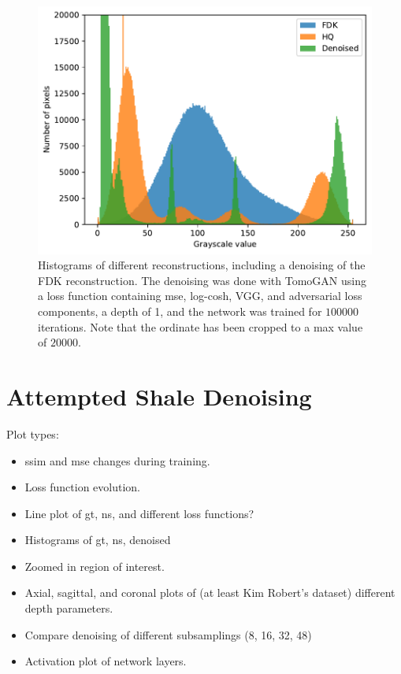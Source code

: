 \begin{figure}[htbp]
  \centering
  \includegraphics[width=.85\textwidth]{figures/kimroberthist.pdf}
  \caption[Histogram]{Histograms of different reconstructions, including a denoising of the FDK reconstruction. The denoising was done with TomoGAN using a loss function containing \acrshort{mse}, log-cosh, VGG, and adversarial loss components, a depth of 1, and the network was trained for $100 000$ iterations. Note that the ordinate has been cropped to a max value of $20000$. }
  \label{fig:kimroberthist}
\end{figure}

\section{Attempted Shale Denoising}

Plot types: 
\begin{itemize}
    \item \acrshort{ssim} and \acrshort{mse} changes during training.
    \item Loss function evolution.
    \item Line plot of gt, ns, and different loss functions?
    \item Histograms of gt, ns, denoised
    \item Zoomed in region of interest.
    \item Axial, sagittal, and coronal plots of (at least Kim Robert's dataset) different depth parameters.
    \item Compare denoising of different subsamplings (8, 16, 32, 48)
    \item Activation plot of network layers.
\end{itemize}